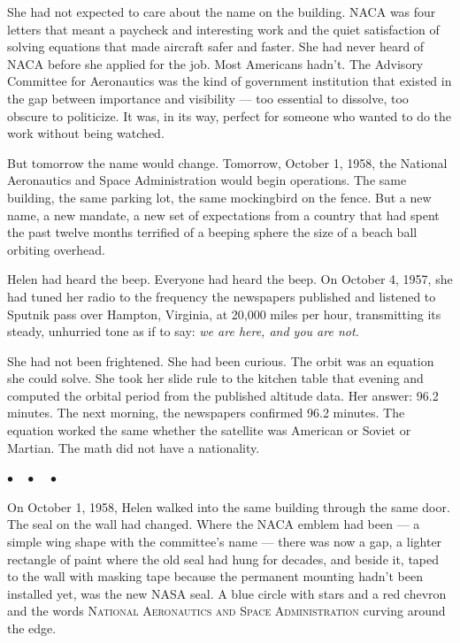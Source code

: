 \documentclass[12pt, letterpaper]{article}
\begin{document}
She had not expected to care about the name on the building. NACA was four letters that meant a paycheck and interesting work and the quiet satisfaction of solving equations that made aircraft safer and faster. She had never heard of NACA before she applied for the job. Most Americans hadn't. The Advisory Committee for Aeronautics was the kind of government institution that existed in the gap between importance and visibility --- too essential to dissolve, too obscure to politicize. It was, in its way, perfect for someone who wanted to do the work without being watched.

But tomorrow the name would change. Tomorrow, October 1, 1958, the National Aeronautics and Space Administration would begin operations. The same building, the same parking lot, the same mockingbird on the fence. But a new name, a new mandate, a new set of expectations from a country that had spent the past twelve months terrified of a beeping sphere the size of a beach ball orbiting overhead.

Helen had heard the beep. Everyone had heard the beep. On October 4, 1957, she had tuned her radio to the frequency the newspapers published and listened to Sputnik pass over Hampton, Virginia, at 20,000 miles per hour, transmitting its steady, unhurried tone as if to say: \textit{we are here, and you are not.}

She had not been frightened. She had been curious. The orbit was an equation she could solve. She took her slide rule to the kitchen table that evening and computed the orbital period from the published altitude data. Her answer: 96.2 minutes. The next morning, the newspapers confirmed 96.2 minutes. The equation worked the same whether the satellite was American or Soviet or Martian. The math did not have a nationality.

\begin{center}
$\bullet\quad\bullet\quad\bullet$
\end{center}

On October 1, 1958, Helen walked into the same building through the same door. The seal on the wall had changed. Where the NACA emblem had been --- a simple wing shape with the committee's name --- there was now a gap, a lighter rectangle of paint where the old seal had hung for decades, and beside it, taped to the wall with masking tape because the permanent mounting hadn't been installed yet, was the new NASA seal. A blue circle with stars and a red chevron and the words \textsc{National Aeronautics and Space Administration} curving around the edge.
\end{document}
